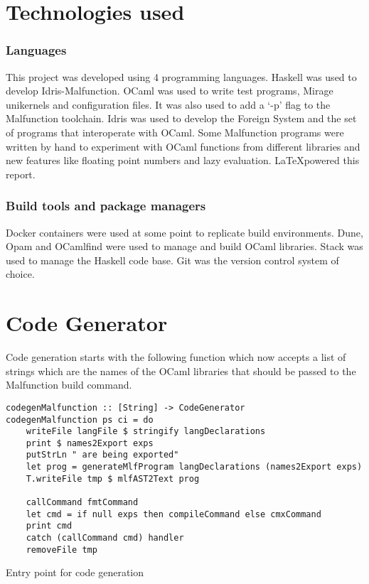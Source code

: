 
\section{Technologies used}

\subsubsection{Languages}
This project was developed using 4 programming languages.
Haskell was used to develop Idris-Malfunction.
OCaml was used to write test programs, Mirage unikernels and configuration
files. It was also used to add a `-p' flag
to the Malfunction toolchain.
Idris was used to develop the Foreign System and the set of programs
that interoperate with OCaml.
Some Malfunction programs were written by hand to experiment
with OCaml functions from different libraries and new features like
floating point numbers and lazy evaluation.
\LaTeX powered this report.

\subsubsection{Build tools and package managers}

Docker containers were used at some point to replicate build
environments.
Dune, Opam and OCamlfind were used to manage and build OCaml libraries.
Stack was used to manage the Haskell code base.
Git was the version control system of choice.

\section{Code Generator}

Code generation starts with the following function which now accepts
a list of strings which are the names of the OCaml libraries
that should be passed to the Malfunction build command.

\begin{listing}[H]
    \begin{verbatim}
codegenMalfunction :: [String] -> CodeGenerator
codegenMalfunction ps ci = do
    writeFile langFile $ stringify langDeclarations
    print $ names2Export exps
    putStrLn " are being exported"
    let prog = generateMlfProgram langDeclarations (names2Export exps)
    T.writeFile tmp $ mlfAST2Text prog
        
    callCommand fmtCommand
    let cmd = if null exps then compileCommand else cmxCommand
    print cmd
    catch (callCommand cmd) handler
    removeFile tmp
    \end{verbatim}
    \caption{Entry point for code generation}
\end{listing}


